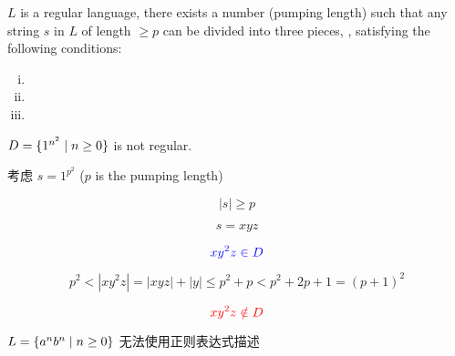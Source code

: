 \begin{frame}{}
  \begin{center}
    \href{https://en.wikipedia.org/wiki/Pumping\_lemma\_for\_regular\_languages}{
      }
  \end{center}

  \vspace{-0.30cm}

  \pause
  \begin{theorem}
     $L$ is a regular language,
     there exists a number 
    (pumping length) such that any string $s$ in $L$ of length $\ge p$
    can be divided into three pieces, , satisfying the following conditions:
    \begin{enumerate}[(i)]
      \item {}
      \item {}
      \item {}
    \end{enumerate}
  \end{theorem}
\end{frame}

\begin{frame}{}
  \begin{example}
    $D = \{1^{n^{2}} \mid n \ge 0\}$ is not regular.
  \end{example}

  \pause
  \vspace{0.50cm}
  \begin{center}
    考虑 $s = 1^{p^{2}}$ \qquad ($p$ is the pumping length)
  \end{center}

  \pause
  \[
    |s| \ge p
  \]

  \pause
  \[
    s = xyz
  \]

  \pause
  \[
    \textcolor{blue}{xy^{2}z \in D}
  \]

  \pause
  \[
    p^2 < |xy^{2}z| = |xyz| + |y| \le p^2 + p < p^2 + 2p + 1 = (p + 1)^2
  \]

  \pause
  \[
    \textcolor{red}{xy^{2}z \notin D}
  \]
\end{frame}

\begin{frame}{}
  \begin{center}
    $L = \{a^{n}b^{n} \mid n \ge 0\}$ 无法使用正则表达式描述

    \vspace{0.50cm}
    \vspace{0.50cm}

  \end{center}
\end{frame}

